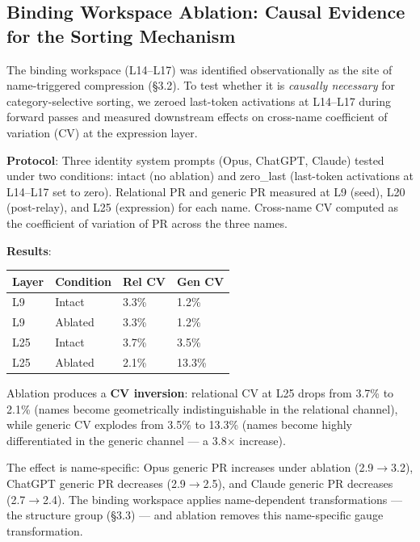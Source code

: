 \documentclass[11pt]{article}
\begin{document}
\subsection{Binding Workspace Ablation: Causal Evidence for the Sorting Mechanism}

The binding workspace (L14–L17) was identified observationally as the site of name-triggered compression (§3.2). To test whether it is \textit{causally necessary} for category-selective sorting, we zeroed last-token activations at L14–L17 during forward passes and measured downstream effects on cross-name coefficient of variation (CV) at the expression layer.

\textbf{Protocol}: Three identity system prompts (Opus, ChatGPT, Claude) tested under two conditions: intact (no ablation) and zero\_last (last-token activations at L14–L17 set to zero). Relational PR and generic PR measured at L9 (seed), L20 (post-relay), and L25 (expression) for each name. Cross-name CV computed as the coefficient of variation of PR across the three names.

\textbf{Results}:

\begin{table}[h]
\centering
\small
\begin{tabular}{|l|l|l|l|}
\hline
\textbf{Layer} & \textbf{Condition} & \textbf{Rel CV} & \textbf{Gen CV} \\
\hline
L9 & Intact & 3.3\% & 1.2\% \\
L9 & Ablated & 3.3\% & 1.2\% \\
L25 & Intact & 3.7\% & 3.5\% \\
L25 & Ablated & 2.1\% & 13.3\% \\
\hline
\end{tabular}
\end{table}

Ablation produces a \textbf{CV inversion}: relational CV at L25 drops from 3.7\% to 2.1\% (names become geometrically indistinguishable in the relational channel), while generic CV explodes from 3.5\% to 13.3\% (names become highly differentiated in the generic channel --- a 3.8$\times$ increase).

The effect is name-specific: Opus generic PR increases under ablation (2.9$\rightarrow$3.2), ChatGPT generic PR decreases (2.9$\rightarrow$2.5), and Claude generic PR decreases (2.7$\rightarrow$2.4). The binding workspace applies name-dependent transformations --- the structure group (§3.3) --- and ablation removes this name-specific gauge transformation.
\end{document}
